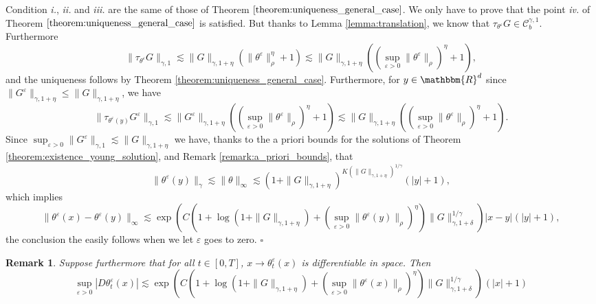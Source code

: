 \documentclass[a4paper,11pt]{article}
\newcommand{\tmtextit}[1]{{\itshape{#1}}}
\newtheorem{remark}[theorem]{Remark}
\newenvironment{proof}{{\sc Proof.}}{\hfill$\square$}
\newcommand{\CC}{\mathscr C}
\begin{document}
\begin{proof}
  Condition \tmtextit{i.}, \tmtextit{ii.} and \tmtextit{iii.} are the same of
  those of Theorem $\ref{theorem:uniqueness_general_case}$. We only have to
  prove that the point \tmtextit{iv.} of Theorem
  $\ref{theorem:uniqueness_general_case}$ is satisfied. But thanks to Lemma
  \ref{lemma:translation}, we know that $\tau_{\theta^{\varepsilon}} G \in
  \CC^{\gamma ,1}_{b}$. Furthermore
  \[ \| \tau_{\theta^{\varepsilon}} G \|_{\gamma ,1} \lesssim \| G \|_{\gamma
     ,1+ \eta} ( \| \theta^{\varepsilon} \|_{\rho}^{\eta} +1 ) \lesssim \| G
     \|_{\gamma ,1+ \eta} ( ( \sup_{\varepsilon >0} \| \theta^{\varepsilon}
     \|_{\rho} )^{\eta} +1 ) , \]
  and the uniqueness follows by Theorem \ref{theorem:uniqueness_general_case}.
  Furthermore, for $y \in \mathbbm{R}^{d}$ since $\| G^{\varepsilon}
  \|_{\gamma ,1+ \eta} \leqslant \| G \|_{\gamma ,1+ \eta}$, we have
  \[ \| \tau_{\theta^{\varepsilon} ( y )} G^{\varepsilon} \|_{\gamma ,1}
     \lesssim \| G^{\varepsilon} \|_{\gamma ,1+ \eta} ( ( \sup_{\varepsilon
     >0} \| \theta^{\varepsilon} \|_{\rho} )^{\eta} +1 ) \lesssim \| G
     \|_{\gamma ,1+ \eta} ( ( \sup_{\varepsilon >0} \| \theta^{\varepsilon}
     \|_{\rho} )^{\eta} +1 ) . \]
  Since $\sup_{\varepsilon >0} \| G^{\varepsilon} \|_{\gamma ,1} \lesssim \| G
  \|_{\gamma ,1+ \eta}$ we have, thanks to the a priori bounds for the
  solutions of Theorem \ref{theorem:existence_young_solution}, and Remark
  \ref{remark:a_priori_bounds}, that
  \[ \| \theta^{\varepsilon} ( y ) \|_{\gamma} \lesssim \| \theta \|_{\infty}
     \lesssim ( 1+ \| G \|_{\gamma ,1+ \eta} )^{K ( \| G \|_{\gamma ,1+ \eta}
     )^{1/ \gamma}} ( | y | +1 ) , \]
  which implies \
  \[ \| \theta^{\varepsilon} ( x ) - \theta^{\varepsilon} ( y ) \|_{\infty}
     \lesssim \exp ( C ( 1+ \log ( 1+ \| G \|_{\gamma ,1+ \eta} ) + (
     \sup_{\varepsilon >0} \| \theta^{\varepsilon} ( y ) \|_{\rho} )^{\eta} )
     \| G \|_{\gamma ,1+ \delta}^{1/ \gamma} ) | x-y |^{} ( | y | +1 ) , \]
  the conclusion the easily follows when we let $\varepsilon$ goes to zero.
\end{proof}

\begin{remark}
  \label{remark:bound_approximated_flow}Suppose furthermore that for all $t
  \in [ 0,T ]$, $x \rightarrow \theta^{\varepsilon}_{t} ( x )$ is
  differentiable in space. Then
  \[ \sup_{\varepsilon >0}   | D \theta^{\varepsilon}_{t} ( x ) | \lesssim
     \exp ( C ( 1+ \log ( 1+ \| G \|_{\gamma ,1+ \eta} ) + ( \sup_{\varepsilon
     >0} \| \theta^{\varepsilon} ( x ) \|_{\rho} )^{\eta} ) \| G \|_{\gamma
     ,1+ \delta}^{1/ \gamma} )^{} ( | x | +1 ) \]
\end{remark}
\end{document}
